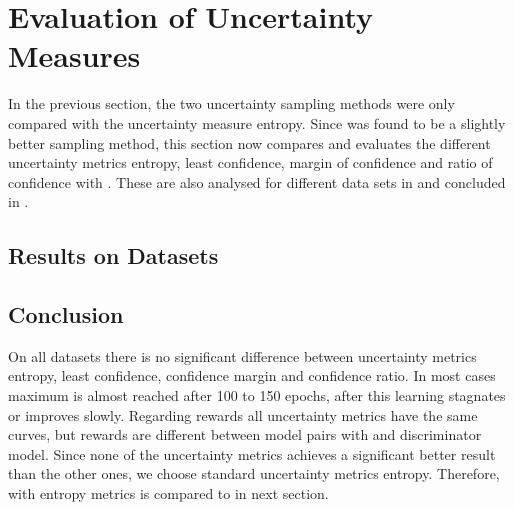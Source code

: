 \section{Evaluation of Uncertainty Measures}
\label{ch:evaluation:sec:evaluation_metrics}
%
In the previous section, the two uncertainty sampling methods were only compared with the uncertainty measure entropy.
Since \ussoftmax was found to be a slightly better sampling method, this section now compares and evaluates the different uncertainty metrics entropy, least confidence, margin of confidence and ratio of confidence with \ussoftmax. 
These are also analysed for different data sets in  and concluded in .
%
\subsection{Results on Datasets} \label{subsec:measures_results}




%
\subsection{Conclusion}
\label{subsec:measure_conclusion}
On all datasets there is no significant difference between uncertainty metrics entropy, least confidence, confidence margin and confidence ratio.
In most cases maximum is almost reached after 100 to 150 epochs, after this learning stagnates or improves slowly.
Regarding rewards all uncertainty metrics have the same curves, but rewards are different between model pairs with \transe and \transe discriminator model.
Since none of the uncertainty metrics achieves a significant better result than the other ones, we choose standard uncertainty metrics entropy.
Therefore, \ussoftmax with entropy metrics is compared to \origsampling in next section.